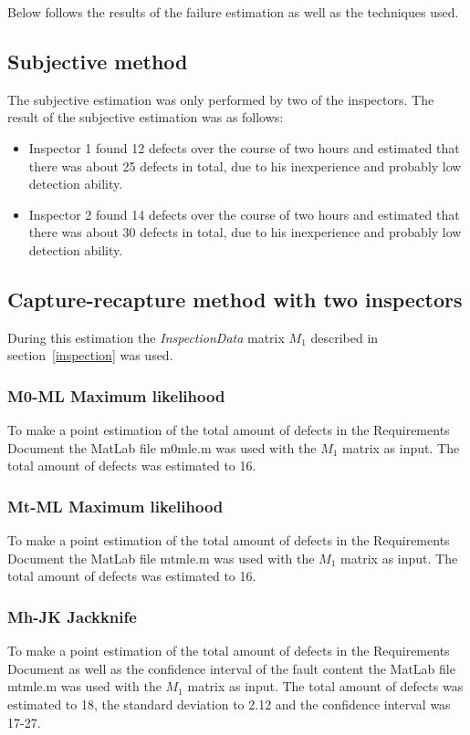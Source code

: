 Below follows the results of the failure estimation as well as the techniques used.

\subsection{Subjective method}
The subjective estimation was only performed by two of the inspectors.
The result of the subjective estimation was as follows:
\begin{itemize}
\item Inspector 1 found 12 defects over the course of two hours and estimated that there was about 25 defects in total, due to his inexperience and probably low detection ability.
\item Inspector 2 found 14 defects over the course of two hours and estimated that there was about 30 defects in total, due to his inexperience and probably low detection ability.
\end{itemize}

\subsection{Capture-recapture method with two inspectors}
During this estimation the \textit{InspectionData} matrix $M_{1}$ described in section~\ref{inspection} was used.
\subsubsection{M0-ML Maximum likelihood}

To make a point estimation of the total amount of defects in the Requirements Document the MatLab file m0mle.m was used with the $M_{1}$ matrix as input. The total amount of defects was estimated to 16.
\subsubsection{Mt-ML Maximum likelihood}
To make a point estimation of the total amount of defects in the Requirements Document the MatLab file mtmle.m was used with the $M_{1}$ matrix as input. The total amount of defects was estimated to 16.
\subsubsection{Mh-JK Jackknife}
To make a point estimation of the total amount of defects in the Requirements Document as well as the confidence interval of the fault content the MatLab file mtmle.m was used with the $M_{1}$ matrix as input. The total amount of defects was estimated to 18, the standard deviation to 2.12 and the confidence interval was 17-27.

